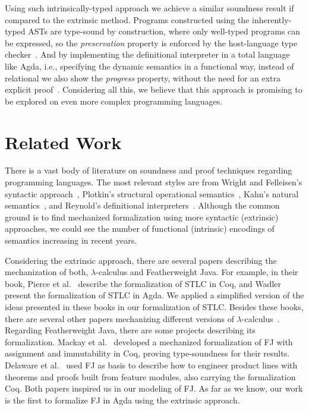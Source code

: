\documentclass[tese,capa,english]{texufpel}
\begin{document}
Using such intrinsically-typed approach we achieve a similar soundness result if compared to the extrinsic method. Programs constructed using the inherently-typed ASTs are type-sound by construction, where only well-typed programs can be expressed, so the \emph{preservation} property is enforced by the host-language type checker~\cite{Amin:2017:TSP:3093333.3009866}. And by implementing the definitional interpreter in a total language like Agda, i.e., specifying the dynamic semantics in a functional way, instead of relational we also show the \emph{progress} property, without the need for an extra explicit proof~\cite{Owens:2016:FBS:3089528.3089551}. Considering all this, we believe that this approach is promising to be explored on even more complex programming languages.

\section{Related Work}

There is a vast body of literature on soundness and proof techniques regarding programming languages. The most relevant styles are from Wright and Felleisen's syntactic approach~\cite{Wright:1994:SAT:191905.191909}, Plotkin's structural operational semantics~\cite{Plotkin2004ASA}, Kahn's natural semantics~\cite{Kahn:1987:NS:28220.28222}, and Reynold's definitional interpreters~\cite{Reynolds:1972:DIH:800194.805852}. Although the common ground is to find mechanized formalization using more syntactic (extrinsic) approaches, we could see the number of functional (intrinsic) encodings of semantics increasing in recent years.

Considering the extrinsic approach, there are several papers describing the mechanization of both, $\lambda$-calculus and Featherweight Java. For example, in their book, Pierce et al.~\cite{pierce2019software} describe the formalization of STLC in Coq, and Wadler~\cite{Wadler-plfa} present the formalization of STLC in Agda. We applied a simplified version of the ideas presented in these books in our formalization of STLC. Besides these books, there are several other papers mechanizing different versions of $\lambda$-calculus~\cite{Ribeiro2013,Donnelly:2007:FSN:1247762.1248307}. Regarding Featherweight Java, there are some projects describing its formalization. Mackay et al.~\cite{Mackay:2012:EFJ:2318202.2318206} developed a mechanized formalization of FJ with assignment and immutability in Coq, proving type-soundness for their results. Delaware et al.~\cite{Delaware:2011:PLT:2076021.2048113} used FJ as basis to describe how to engineer product lines with theorems and proofs built from feature modules, also carrying the formalization Coq. Both papers inspired us in our modeling of FJ. As far as we know, our work is the first to formalize FJ in Agda using the extrinsic approach.
\end{document}
